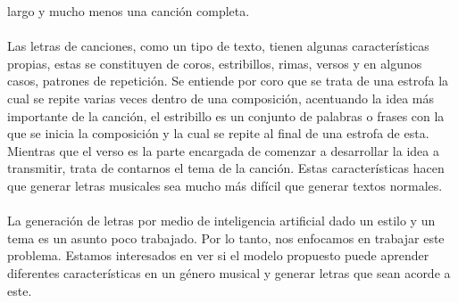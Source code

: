   largo y mucho menos una canción completa.\\\\
  Las letras de canciones, como un tipo de texto, tienen algunas características propias,
  estas se constituyen de coros, estribillos, rimas, versos y en algunos casos, patrones de
  repetición. Se entiende por coro que se trata de una estrofa la cual se repite varias
  veces dentro de una composición, acentuando la idea más importante de la canción, el
  estribillo es un conjunto de palabras o frases con la que se inicia la composición y
  la cual se repite al final de una estrofa de esta. Mientras que el verso es la parte
  encargada de comenzar a desarrollar la idea a transmitir, trata de contarnos el tema
  de la canción. Estas características hacen que generar letras musicales sea mucho más
  difícil que generar textos normales.\\\\
  La generación de letras por medio de inteligencia artificial dado un estilo y un tema
  es un asunto poco trabajado. Por lo tanto, nos enfocamos en trabajar este problema.
  Estamos interesados en ver si el modelo propuesto puede aprender diferentes características en
  un género musical y generar letras que sean acorde a este.
  